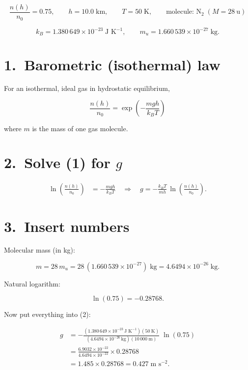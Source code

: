 \documentclass[12pt]{article}
\theoremstyle{definition} %
\theoremstyle{plain} %
\begin{document}
\[
\frac{n(h)}{n_0}=0.75,\qquad h=10.0\;\text{km},\qquad
T=50\;\text{K},\qquad
\text{molecule: } \mathrm{N_2}\;(M = 28\ \text{u})
\]

\[
k_B = 1.380\,649\times10^{-23}\;\text{J K}^{-1},\qquad
m_u = 1.660\,539\times10^{-27}\;\text{kg}.
\]

\section*{1.\ Barometric (isothermal) law}

For an isothermal, ideal gas in hydrostatic equilibrium,

\[
\boxed{\;
  \frac{n(h)}{n_0}
     = \exp\!\left(-\frac{mgh}{k_B T}\right)
\;}
\tag{1}
\]

where \(m\) is the mass of one gas molecule.

\section*{2.\ Solve (1) for \(g\)}

\[
\begin{aligned}
\ln\!\left(\frac{n(h)}{n_0}\right)
      &= -\frac{mgh}{k_B T}
      \quad\Longrightarrow\quad
      g
      = -\frac{k_B T}{m h}\,
        \ln\!\left(\frac{n(h)}{n_0}\right).
\end{aligned}
\tag{2}
\]

\section*{3.\ Insert numbers}

Molecular mass (in kg):

\[
m = 28\,m_u
    = 28\,(1.660\,539\times10^{-27})\;\text{kg}
    = 4.6494\times10^{-26}\;\text{kg}.
\]

Natural logarithm:

\[
\ln(0.75) = -0.28768.
\]

Now put everything into (2):

\[
\begin{aligned}
g
&= -\frac{(1.380\,649\times10^{-23}\,\text{J K}^{-1})(50\;\text{K})}
         {(4.6494\times10^{-26}\,\text{kg})(10\,000\;\text{m})}
     \;\ln(0.75) \\[6pt]
&= \frac{6.9032\times10^{-22}}{4.6494\times10^{-22}}
     \times 0.28768 \\[6pt]
&= 1.485 \times 0.28768
 = 0.427\;\text{m s}^{-2}.
\end{aligned}
\]
\end{document}
